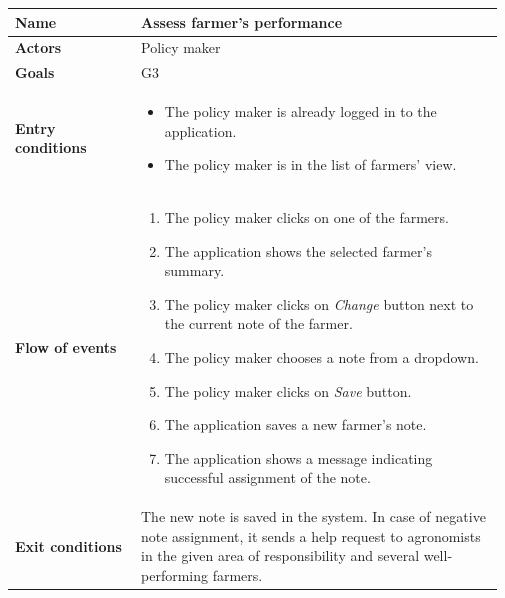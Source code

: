 \begin{table}[H]
    \centering
	\begin{tabular}{@{}p{0.25\linewidth} p{0.72\linewidth}@{}}
\toprule
		\textbf{Name}               & Assess farmer's performance\\
		\midrule
		\textbf{Actors}             & Policy maker\\
		\midrule
		\textbf{Goals}              & G3 \\
		\midrule
		
		\textbf{Entry conditions}   & \begin{itemize}[leftmargin=.4cm,noitemsep,topsep=0pt,before=\vspace{-3mm},after=\vspace{-4mm}]
		    \item The policy maker is already logged in to the application.
		    \item The policy maker is in the list of farmers' view. 
		\end{itemize}\\
		\midrule
		
		\textbf{Flow of events}     & \begin{enumerate}[leftmargin=.4cm,noitemsep,topsep=0pt,before=\vspace{-3mm},after=\vspace{-4mm}]
		    \item The policy maker clicks on one of the farmers.
		    \item The application shows the selected farmer's summary.
		    \item The policy maker clicks on \textit{Change} button next to the current note of the farmer.
		    \item The policy maker chooses a note from a dropdown.
		    \item The policy maker clicks on \textit{Save} button.
		    \item The application saves a new farmer's note.
		    \item The application shows a message indicating successful assignment of the note.
		\end{enumerate}\\
		\midrule
		\textbf{Exit conditions}    & The new note is saved in the system. In case of negative note assignment, it sends a help request to agronomists in the given area of responsibility and several well-performing farmers. \\
		\midrule
		

\end{tabular}
\end{table}

